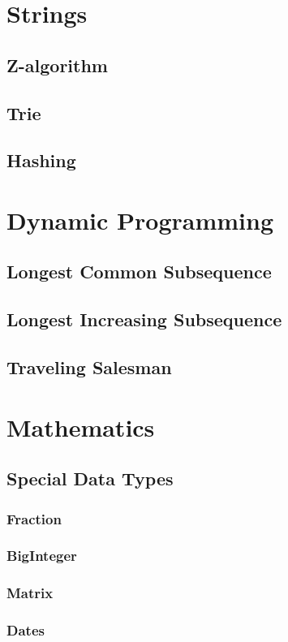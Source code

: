 \documentclass[8pt,a4paper,landscape,oneside]{amsart}
\begin{document}
\begin{multicols*}{3}
\section{Strings}
	\subsection{Z-algorithm}
	\subsection{Trie}
	\subsection{Hashing}
\section{Dynamic Programming}
	\subsection{Longest Common Subsequence}
	\subsection{Longest Increasing Subsequence}
	\subsection{Traveling Salesman}
\section{Mathematics}
	\subsection{Special Data Types}
		\subsubsection{Fraction}
		\subsubsection{BigInteger}
		\subsubsection{Matrix}
		\subsubsection{Dates}

\end{multicols*}
\end{document}

